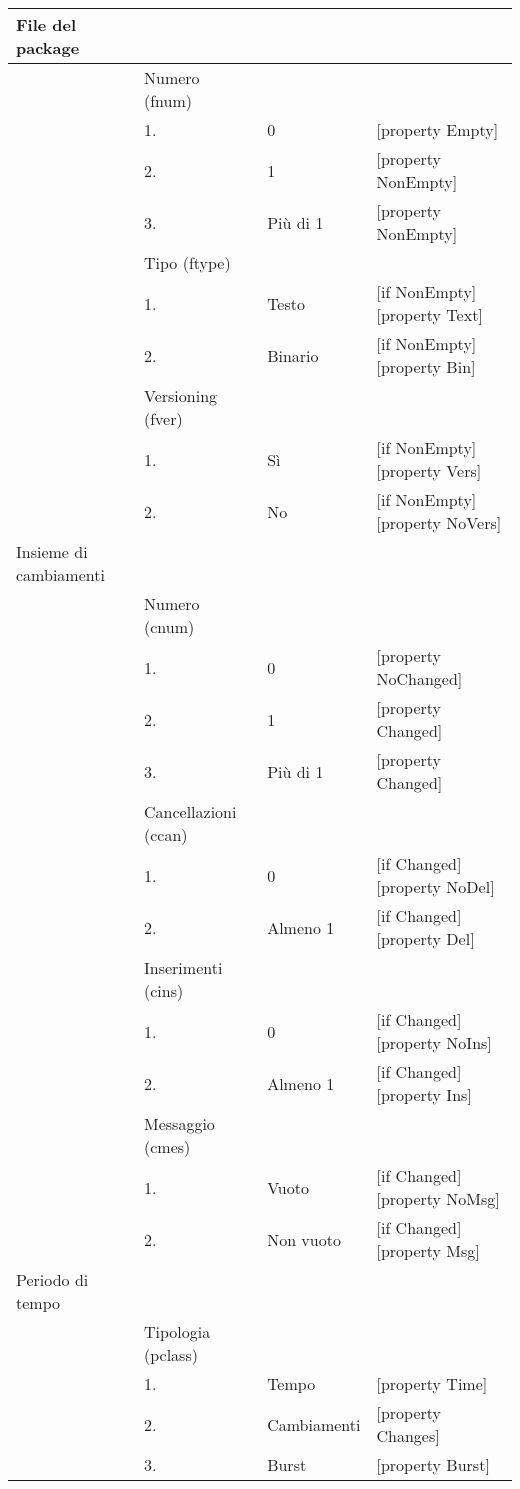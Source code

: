 \begin{tabular}{|l|l|l|l|}
\hline
File del package			&			&			&				\\
\hline
		&	Numero (fnum)				&			&				\\
		&	1.					&	0		&	[property Empty]	\\
		&	2.					&	1		&	[property NonEmpty]	\\
		&	3.					&	Più di 1	&	[property NonEmpty]	\\
		&	Tipo (ftype)				&			&				\\
		&	1.					&	Testo		&	[if NonEmpty][property Text]\\
		&	2.					&	Binario		&	[if NonEmpty][property Bin]\\
		&	Versioning (fver)			&			&				\\
		&	1.					&	Sì		&	[if NonEmpty][property Vers]\\
		&	2.					&	No		&	[if NonEmpty][property NoVers]\\
\hline
Insieme di cambiamenti	&					&			&				\\
\hline
		&	Numero (cnum)				&			&				\\
		&	1.					&	0		&	[property NoChanged]	\\
		&	2.					&	1		&	[property Changed]	\\
		&	3.					&	Più di 1	&	[property Changed]	\\
		&	Cancellazioni (ccan)			&			&				\\
		&	1.					&	0		&	[if Changed][property NoDel]\\
		&	2.					&	Almeno 1	&	[if Changed][property Del]\\
		&	Inserimenti (cins)			&			&				\\
		&	1.					&	0		&	[if Changed][property NoIns]\\
		&	2.					&	Almeno 1	&	[if Changed][property Ins]\\
		&	Messaggio (cmes)			&			&				\\
		&	1.					&	Vuoto		&	[if Changed][property NoMsg]\\
		&	2.					&	Non vuoto	&	[if Changed][property Msg]\\
\hline
Periodo di tempo	&					&			&				\\
		&	Tipologia (pclass)			&			&				\\
		&	1.					&	Tempo		&	[property Time]		\\
		&	2.					&	Cambiamenti	&	[property Changes]	\\
		&	3.					&	Burst		&	[property Burst]	\\

\end{tabular}
